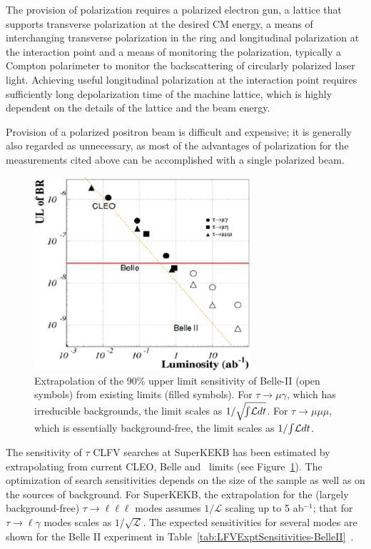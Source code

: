 The provision of polarization requires a polarized electron gun, 
a lattice that supports transverse
polarization at the desired CM energy, a means of interchanging transverse polarization in the
ring and longitudinal polarization at the interaction point and a means of monitoring
the polarization, typically a Compton polarimeter to monitor the
backscattering of circularly polarized laser light. Achieving useful longitudinal polarization at the interaction point requires sufficiently long depolarization time of the machine lattice, which is highly dependent on the details of the lattice and the beam energy.

Provision of a
polarized positron beam is difficult and expensive; it is generally
also regarded as unnecessary, as most of the
advantages of polarization for the measurements cited above can be
accomplished with a single polarized beam.

\begin{figure}[htb]

\begin{center}
\includegraphics[width=8cm]{ChargedLeptons/Figures/Belle-tau.pdf}
\smallskip
\caption{\label{CL:Belle}Extrapolation of the 90\% upper limit sensitivity of Belle-II (open symbols) from existing limits (filled symbols). For $\tau\rightarrow \mu\gamma$, which has irreducible backgrounds, the limit scales as $1/{\sqrt{\!\int{\!\cal{L}}dt}}$. For $\tau\rightarrow \mu\mu\mu$, which is essentially background-free, the limit scales as $1/{\int{\!\cal{L}}dt}$.}
\end{center}
\end{figure}

The sensitivity of $\tau$ CLFV searches at SuperKEKB has been estimated by extrapolating from current CLEO, Belle and \babar\  
limits (see Figure~\ref{CL:Belle}). The optimization of search sensitivities depends on the size
of the sample as well as on the sources of background. For SuperKEKB, the
extrapolation for the (largely background-free) $\tau\to\ell\ell\ell$
modes assumes $1/{\mathcal L}$ scaling up to 5 ab$^{-1}$; that for $\tau\to\ell\gamma$
modes scales as $1/{\sqrt{\mathcal L}}$. 
The expected sensitivities for several modes are shown for the Belle II experiment in Table~\ref{tab:LFVExptSensitivities-BelleII}~\cite{Abe:2010sj}.  

